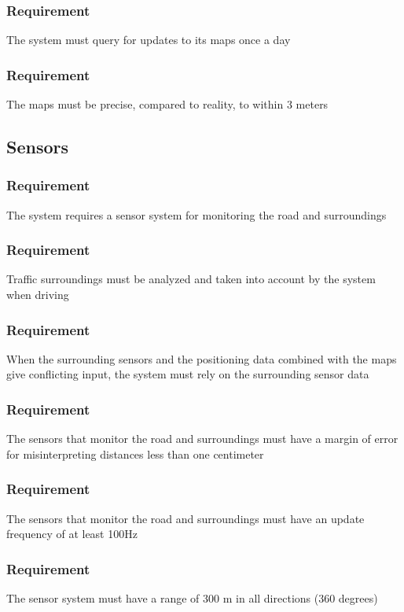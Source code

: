 \documentclass{article}
\begin{document}
{      \subsubsection{Requirement}
\hfill \break 
\- \- \-The system must query for updates to its maps once a day
      \subsubsection{Requirement}
\hfill \break 
\- \- \-The maps must be precise, compared to reality, to within 3 meters
  \subsection{Sensors}
      \subsubsection{Requirement}
\hfill \break 
\- \- \-The system requires a sensor system for monitoring the road and surroundings
      \subsubsection{Requirement}
\hfill \break 
\- \- \-Traffic surroundings must be analyzed and taken into account by the system when driving
      \subsubsection{Requirement}
\hfill \break 
\- \- \-When the surrounding sensors and the positioning data combined with the maps give conflicting input, the system must rely on the surrounding sensor data
      \subsubsection{Requirement}
\hfill \break 
\- \- \-The sensors that monitor the road and surroundings must have a margin of error for misinterpreting distances less than one centimeter
      \subsubsection{Requirement}
\hfill \break 
\- \- \-The sensors that monitor the road and surroundings must have an update frequency of at least 100Hz
      \subsubsection{Requirement}
\hfill \break 
\- \- \-The sensor system must have a range of 300 m in all directions (360 degrees)
}
\end{document}
